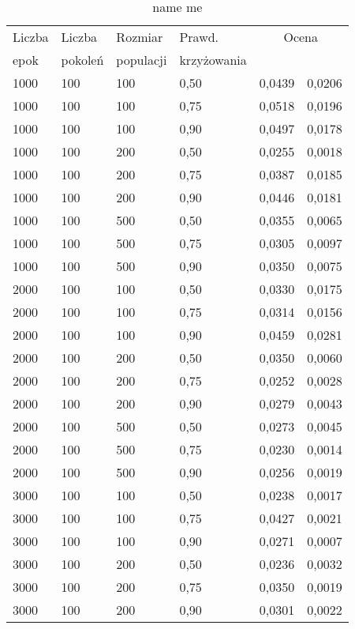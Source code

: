 \documentclass[11pt,a4paper,oneside]{report}
\begin{document}
\begin{center} 
	\begin{longtable}{|l|l|l|l|r@{$\pm$}r|}
		\caption{name me}\\
		\hline
		Liczba & Liczba & Rozmiar & Prawd. & \multicolumn{2}{|c|}{Ocena} \\
		epok & pokoleń & populacji & krzyżowania & \multicolumn{2}{|c|}{}\\ \hline \hline\endhead
		1000 & 100 & 100 & 0,50 & 0,0439 & 0,0206\\ \hline
		1000 & 100 & 100 & 0,75 & 0,0518 & 0,0196\\ \hline
		1000 & 100 & 100 & 0,90 & 0,0497 & 0,0178\\ \hline
		1000 & 100 & 200 & 0,50 & 0,0255 & 0,0018\\ \hline
		1000 & 100 & 200 & 0,75 & 0,0387 & 0,0185\\ \hline
		1000 & 100 & 200 & 0,90 & 0,0446 & 0,0181\\ \hline
		1000 & 100 & 500 & 0,50 & 0,0355 & 0,0065\\ \hline
		1000 & 100 & 500 & 0,75 & 0,0305 & 0,0097\\ \hline
		1000 & 100 & 500 & 0,90 & 0,0350 & 0,0075\\ \hline
		2000 & 100 & 100 & 0,50 & 0,0330 & 0,0175\\ \hline
		2000 & 100 & 100 & 0,75 & 0,0314 & 0,0156\\ \hline
		2000 & 100 & 100 & 0,90 & 0,0459 & 0,0281\\ \hline
		2000 & 100 & 200 & 0,50 & 0,0350 & 0,0060\\ \hline
		2000 & 100 & 200 & 0,75 & 0,0252 & 0,0028\\ \hline
		2000 & 100 & 200 & 0,90 & 0,0279 & 0,0043\\ \hline
		2000 & 100 & 500 & 0,50 & 0,0273 & 0,0045\\ \hline
		2000 & 100 & 500 & 0,75 & 0,0230 & 0,0014\\ \hline
		2000 & 100 & 500 & 0,90 & 0,0256 & 0,0019\\ \hline
		3000 & 100 & 100 & 0,50 & 0,0238 & 0,0017\\ \hline
		3000 & 100 & 100 & 0,75 & 0,0427 & 0,0021\\ \hline
		3000 & 100 & 100 & 0,90 & 0,0271 & 0,0007\\ \hline
		3000 & 100 & 200 & 0,50 & 0,0236 & 0,0032\\ \hline
		3000 & 100 & 200 & 0,75 & 0,0350 & 0,0019\\ \hline
		3000 & 100 & 200 & 0,90 & 0,0301 & 0,0022\\ \hline

\end{longtable}
\end{center}
\end{document}
